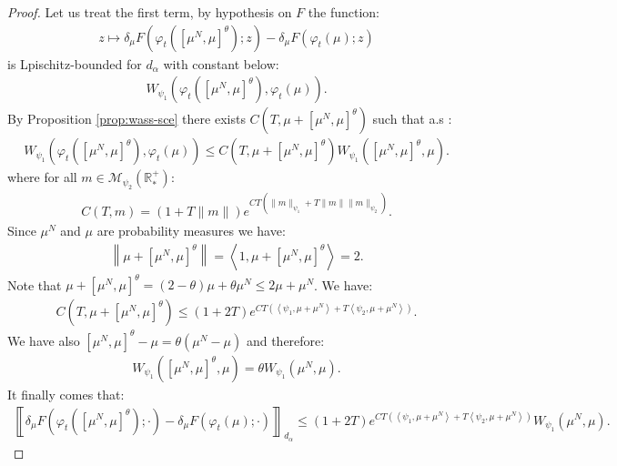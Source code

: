 \documentclass[11pt,a4paper]{article}
\newcommand{\RRP}{\mathbb{R}^+_*}
\newcommand{\MC}{\mathcal{M}}
\newcommand{\brac}[1]{\left\langle#1\right\rangle}
\begin{document}
\begin{proof}
    Let us treat the first term, by hypothesis on $F$ the function:
    \begin{align*}
        z \mapsto \delta_\mu F\left(\varphi_t \left(\left[\mu^N,\mu \right]^\theta\right);z \right)- \delta_\mu F\left(\varphi_t \left(\mu\right);z \right)
    \end{align*}
    is Lpischitz-bounded for $d_\alpha$ with constant below:
    \begin{align*}
        W_{\psi_1}\left(\varphi_t \left(\left[\mu^N,\mu \right]^\theta\right), \varphi_t \left(\mu \right)\right).
    \end{align*}
    By Proposition \ref{prop:wass-sce} there exists $C(T,\mu + \left[\mu^N,\mu \right]^\theta)$ such that a.s :
    \begin{align*}
        W_{\psi_1}\left(\varphi_t \left(\left[\mu^N,\mu \right]^\theta\right), \varphi_t \left(\mu \right)\right) \leq C(T,\mu + \left[\mu^N,\mu \right]^\theta)W_{\psi_1}\left( \left[\mu^N,\mu \right]^\theta , \mu\right).
    \end{align*}
    where for all $m \in \MC_{\psi_2}(\RRP)$:
    \begin{align*}
        C(T,m) = \left( 1 + T\|m\|\right)e^{CT\left(\|m\|_{\psi_1} + T \|m\|\|m\|_{\psi_2} \right)}.
    \end{align*}
    Since $\mu^N$ and $\mu$ are probability measures we have:
    \begin{align*}
        \left\|\mu + \left[\mu^N,\mu \right]^\theta \right\| = \brac{1, \mu + \left[\mu^N,\mu \right]^\theta} = 2.
    \end{align*}
    Note that $\mu + \left[\mu^N,\mu \right]^\theta = (2-\theta)\mu + \theta \mu^N \leq 2\mu + \mu^N$. We have:
    \begin{align*}
        C(T,\mu + \left[\mu^N,\mu \right]^\theta) \leq (1 + 2T) e^{CT\left(\brac{\psi_1,\mu + \mu^N} + T\brac{\psi_2,\mu + \mu^N}\right)}.
    \end{align*}
    We have also $\left[\mu^N,\mu \right]^\theta-\mu = \theta(\mu^N - \mu)$ and therefore:
    \begin{align*}
        W_{\psi_1}\left( \left[\mu^N,\mu \right]^\theta , \mu\right) = \theta  W_{\psi_1}\left( \mu^N , \mu\right).
    \end{align*}
    It finally comes that:
    \begin{multline*}
        \left\llbracket \delta_\mu F\left(\varphi_t \left(\left[\mu^N,\mu \right]^\theta\right);\cdot \right)- \delta_\mu F\left(\varphi_t \left(\mu\right);\cdot \right)  \right\rrbracket_{d_\alpha} \leq (1 + 2T) e^{CT\left(\brac{\psi_1,\mu + \mu^N} + T\brac{\psi_2,\mu + \mu^N}\right)}W_{\psi_1}\left( \mu^N , \mu\right).

\end{multline*}
\end{proof}
\end{document}

